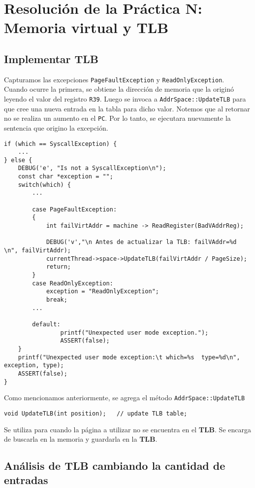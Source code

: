 \chapter{Resolución de la Práctica N: Memoria virtual y TLB}
\section{Implementar TLB} \label{update_TLB}
Capturamos las excepciones \texttt{PageFaultException} y \texttt{ReadOnlyException}.\\
Cuando ocurre la primera, se obtiene la dirección de memoria que la originó leyendo el valor del registro \texttt{R39}. Luego se invoca a \texttt{AddrSpace::UpdateTLB} para que cree una nueva entrada en la tabla para dicho valor. Notemos que al retornar no se realiza un aumento en el \texttt{PC}. Por lo tanto, se ejecutara nuevamente la sentencia que origino la excepción.
\begin{lstlisting}[style=C]
if (which == SyscallException) {
	...
} else {
	DEBUG('e', "Is not a SyscallException\n");
    const char *exception = "";
    switch(which) {
    	...
    	
		case PageFaultException:
		{
	    	int failVirtAddr = machine -> ReadRegister(BadVAddrReg);

	        DEBUG('v',"\n Antes de actualizar la TLB: failVAddr=%d \n", failVirtAddr);
			currentThread->space->UpdateTLB(failVirtAddr / PageSize);
	        return;
		}
	    case ReadOnlyException: 
	    	exception = "ReadOnlyException";
    	    break;	    
    	...
    	
    	default:
                printf("Unexpected user mode exception.");
                ASSERT(false);
    }
    printf("Unexpected user mode exception:\t which=%s  type=%d\n", exception, type);
    ASSERT(false);
}
\end{lstlisting}
Como mencionamos anteriormente, se agrega el método \texttt{AddrSpace::UpdateTLB}
\begin{lstlisting}[style=C]
void UpdateTLB(int position);   // update TLB table;
\end{lstlisting}
Se utiliza para cuando la página a utilizar no se encuentra en el \textbf{TLB}. Se encarga de buscarla en la memoria y guardarla en la \textbf{TLB}.
\section{Análisis de TLB cambiando la cantidad de entradas}
